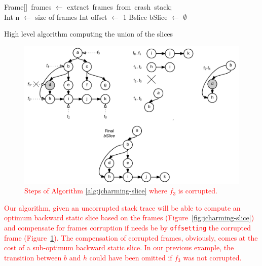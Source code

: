 \documentclass[times, doublespace]{smrauth}
\newcommand{\red}[1]{\textcolor{red}{#1}}
\begin{document}
{\vspace*{0.3cm}

\begin{algorithm}
 Frame[]~frames $\leftarrow$ extract~frames~from~crash~stack; \\
 Int n $\leftarrow$ size of frames\;
 Int offset $\leftarrow$ 1\;
 Bslice bSlice $\leftarrow$ $\emptyset$\;
\caption{High level algorithm computing the union of the slices\label{alg:jcharming-slice}}
\end{algorithm}

\vspace*{0.3cm}


\begin{figure}
  \centering
    \includegraphics[scale=.20]{media/algo.png}
    \caption{\red{Steps of Algorithm \ref{alg:jcharming-slice} where $f_3$ is corrupted.}
    \label{fig:jcharming-algo}}
\end{figure}

\red{Our algorithm, given an uncorrupted stack trace will be able to compute an optimum backward static slice based on the frames (Figure~\ref{fig:jcharming-slice}) and compensate for frames corruption if needs be by \texttt{offsetting} the corrupted frame (Figure~\ref{fig:jcharming-algo}).
The compensation of corrupted frames, obviously, comes at the cost of a sub-optimum backward static slice.
In our previous example, the transition between $b$ and $h$ could have been omitted if $f_3$ was not corrupted.
}


}
\end{document}
